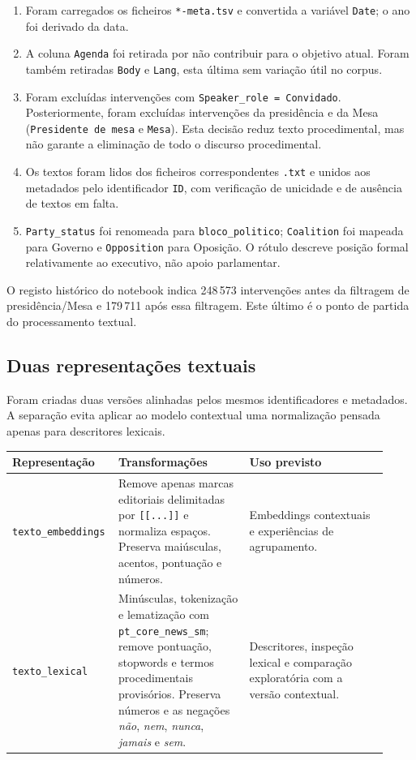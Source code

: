 \documentclass[11pt,a4paper]{article}
\begin{document}
\begin{enumerate}
  \item Foram carregados os ficheiros \texttt{*-meta.tsv} e convertida a variável \texttt{Date}; o ano foi derivado da data.
  \item A coluna \texttt{Agenda} foi retirada por não contribuir para o objetivo atual. Foram também retiradas \texttt{Body} e \texttt{Lang}, esta última sem variação útil no corpus.
  \item Foram excluídas intervenções com \texttt{Speaker\_role = Convidado}. Posteriormente, foram excluídas intervenções da presidência e da Mesa (\texttt{Presidente de mesa} e \texttt{Mesa}). Esta decisão reduz texto procedimental, mas não garante a eliminação de todo o discurso procedimental.
  \item Os textos foram lidos dos ficheiros correspondentes \texttt{.txt} e unidos aos metadados pelo identificador \texttt{ID}, com verificação de unicidade e de ausência de textos em falta.
  \item \texttt{Party\_status} foi renomeada para \texttt{bloco\_politico}; \texttt{Coalition} foi mapeada para Governo e \texttt{Opposition} para Oposição. O rótulo descreve posição formal relativamente ao executivo, não apoio parlamentar.
\end{enumerate}

O registo histórico do notebook indica 248\,573 intervenções antes da filtragem de presidência/Mesa e 179\,711 após essa filtragem. Este último é o ponto de partida do processamento textual.

\subsection{Duas representações textuais}

Foram criadas duas versões alinhadas pelos mesmos identificadores e metadados. A separação evita aplicar ao modelo contextual uma normalização pensada apenas para descritores lexicais.

\begin{longtable}{p{0.22\linewidth}p{0.34\linewidth}p{0.36\linewidth}}
\toprule
Representação & Transformações & Uso previsto \\
\midrule
\endhead
\texttt{texto\_embeddings} & Remove apenas marcas editoriais delimitadas por \texttt{[[...]]} e normaliza espaços. Preserva maiúsculas, acentos, pontuação e números. & Embeddings contextuais e experiências de agrupamento. \\
\addlinespace
\texttt{texto\_lexical} & Minúsculas, tokenização e lematização com \texttt{pt\_core\_news\_sm}; remove pontuação, stopwords e termos procedimentais provisórios. Preserva números e as negações \emph{não}, \emph{nem}, \emph{nunca}, \emph{jamais} e \emph{sem}. & Descritores, inspeção lexical e comparação exploratória com a versão contextual. \\
\bottomrule
\end{longtable}
\end{document}
